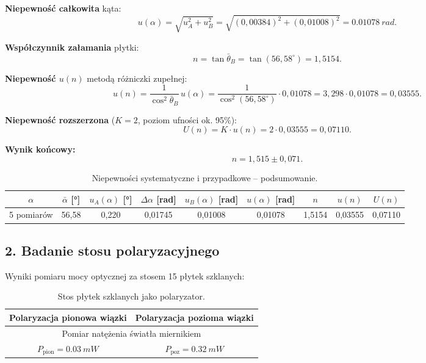 \documentclass[a4paper,12pt]{article}
\begin{document}
\textbf{Niepewność całkowita} kąta:
\[
u(\alpha) = \sqrt{u_A^2 + u_B^2}
= \sqrt{(0{,}00384)^2 + (0{,}01008)^2}
= \SI{0,01078}{rad}.
\]

\textbf{Współczynnik załamania} płytki:
\[
n = \tan\bar{\theta}_B = \tan(56{,}58^\circ) = 1{,}5154.
\]

\textbf{Niepewność $u(n)$} metodą różniczki zupełnej:
\[
u(n) = \frac{1}{\cos^2\bar{\theta}_B}\,u(\alpha)
= \frac{1}{\cos^2(56{,}58^\circ)} \cdot 0{,}01078
= 3{,}298 \cdot 0{,}01078 = 0{,}03555.
\]

\textbf{Niepewność rozszerzona} ($K = 2$, poziom ufności ok. 95\%):
\[
U(n) = K \cdot u(n) = 2 \cdot 0{,}03555 = 0{,}07110.
\]

\textbf{Wynik końcowy:}
\[
\boxed{n = 1{,}515 \pm 0{,}071}.
\]

\begin{table}[H]
\centering
\caption{Niepewności systematyczne i przypadkowe -- podsumowanie.}
\renewcommand{\arraystretch}{1.3}
\small
\begin{tabular}{c S[table-format=2.2] S[table-format=1.5] S[table-format=1.5] S[table-format=1.5] S[table-format=1.5] S[table-format=1.4] S[table-format=1.5] S[table-format=1.5]}
\toprule
{$\alpha$} & {$\bar{\alpha}$ [\si{\degree}]} & {$u_A(\alpha)$ [\si{\degree}]} & {$\Delta\alpha$ [rad]} & {$u_B(\alpha)$ [rad]} & {$u(\alpha)$ [rad]} & {$n$} & {$u(n)$} & {$U(n)$} \\
 pomiarów & 56,58 & 0,220 & 0,01745 & 0,01008 & 0,01078 & 1,5154 & 0,03555 & 0,07110 \\
\bottomrule
\end{tabular}
\end{table}

\subsection*{2. Badanie stosu polaryzacyjnego}

Wyniki pomiaru mocy optycznej za stosem 15 płytek szklanych:

\begin{table}[H]
\centering
\caption{Stos płytek szklanych jako polaryzator.}
\renewcommand{\arraystretch}{1.3}
\begin{tabular}{cc}
\toprule
Polaryzacja pionowa wiązki & Polaryzacja pozioma wiązki \\
\midrule
\multicolumn{2}{c}{Pomiar natężenia światła miernikiem} \\
\midrule
$P_{\text{pion}} = \SI{0,03}{mW}$ & $P_{\text{poz}} = \SI{0,32}{mW}$ \\
\bottomrule
\end{tabular}
\end{table}
\end{document}
